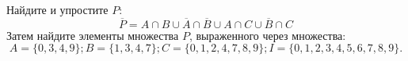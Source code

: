 \question
Найдите и упростите $P$:
\begin{equation*}
\overline{P} = A \cap B \cup \overline{A} \cap \overline{B} \cup A \cap C \cup \overline{B} \cap C
\end{equation*}
Затем найдите элементы множества $P$, выраженного через множества:
\begin{equation*}
	A = \{0, 3, 4, 9\}; 
	B = \{1, 3, 4, 7\};
	C = \{0, 1, 2, 4, 7, 8, 9\};
	I = \{0, 1, 2, 3, 4, 5, 6, 7, 8, 9\}.
\end{equation*}